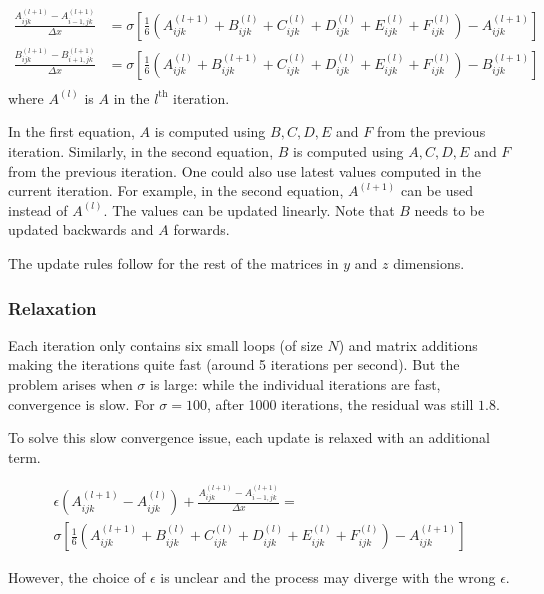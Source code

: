 \documentclass[11pt,titlepage]{article}
\begin{document}
\begin{align*}
    \frac{A^{(l + 1)}_{ijk} - A^{(l + 1)}_{i-1,jk}}{\Delta x} &=
    \sigma [\frac{1}{6}(A^{(l + 1)}_{ijk} + B^{(l)}_{ijk} + C^{(l)}_{ijk} + D^{(l)}_{ijk} + E^{(l)}_{ijk} +
    F^{(l)}_{ijk}) - A^{(l + 1)}_{ijk}] \\
    \frac{B^{(l + 1)}_{ijk} - B^{(l + 1)}_{i+1,jk}}{\Delta x} &=
    \sigma [\frac{1}{6}(A^{(l)}_{ijk} + B^{(l + 1)}_{ijk} + C^{(l)}_{ijk} + D^{(l)}_{ijk} + E^{(l)}_{ijk} +
    F^{(l)}_{ijk}) - B^{(l + 1)}_{ijk}] \\
\end{align*} where $A^{(l)}$ is $A$ in the $l^{\text{th}}$ iteration.

In the first equation, $A$ is computed using $B, C, D, E$ and $F$ from the previous iteration. Similarly, in the
second equation, $B$ is computed using $A, C, D, E$ and $F$ from the previous iteration. One could also use latest
values computed in the current iteration. For example, in the second equation, $A^{(l + 1)}$ can be used instead of
$A^{(l)}$. The values can be updated linearly. Note that $B$ needs to be updated backwards and $A$ forwards.

The update rules follow for the rest of the matrices in $y$ and $z$ dimensions.

\subsubsection{Relaxation}

Each iteration only contains six small loops (of size $N$) and matrix additions making the iterations quite fast (around
5 iterations per second). But the problem arises when $\sigma$ is large: while the individual iterations are fast,
convergence is slow. For $\sigma = 100$, after 1000 iterations, the residual was still $1.8$.

To solve this slow convergence issue, each update is relaxed with an additional term.

\begin{multline*}
    \epsilon (A^{(l + 1)}_{ijk} - A^{(l)}_{ijk}) + \frac{A^{(l + 1)}_{ijk} - A^{(l + 1)}_{i-1,jk}}{\Delta x} = \\
    \sigma [\frac{1}{6}(A^{(l + 1)}_{ijk} + B^{(l)}_{ijk} + C^{(l)}_{ijk} + D^{(l)}_{ijk} + E^{(l)}_{ijk} +
    F^{(l)}_{ijk}) - A^{(l + 1)}_{ijk}]
\end{multline*}

However, the choice of $\epsilon$ is unclear and the process may diverge with the wrong $\epsilon$.
\end{document}
